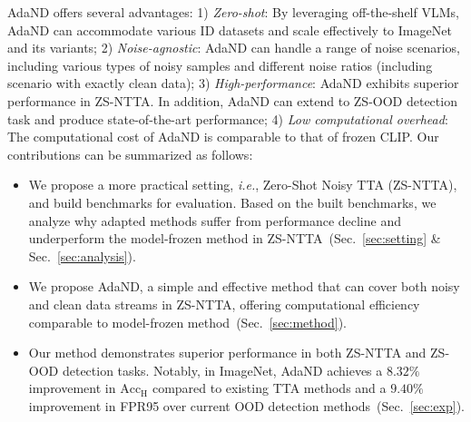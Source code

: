 AdaND offers several advantages: 1) \textit{Zero-shot}: By leveraging off-the-shelf VLMs, AdaND can accommodate various ID datasets and scale effectively to ImageNet and its variants; 2) \textit{Noise-agnostic}: AdaND can handle a range of noise scenarios, including various types of noisy samples and different noise ratios (including scenario with exactly clean data); 3) \textit{High-performance}: AdaND exhibits superior performance in ZS-NTTA. In addition, AdaND can extend to ZS-OOD detection task and produce state-of-the-art performance; 4) \textit{Low computational overhead}: The computational cost of AdaND is comparable to that of frozen CLIP. 
Our contributions can be summarized as follows:
\begin{itemize}[leftmargin=.1in]
\item We propose a more practical setting, \textit{i.e.}, Zero-Shot Noisy TTA (ZS-NTTA), and build benchmarks for evaluation. 
Based on the built benchmarks, we analyze why adapted methods suffer from performance decline and underperform the model-frozen method in ZS-NTTA~(Sec.~\ref{sec:setting} \& Sec.~\ref{sec:analysis}).


\item We propose AdaND, a simple and effective method that can cover both noisy and clean data streams in ZS-NTTA, offering computational efficiency comparable to model-frozen method~(Sec.~\ref{sec:method}).

\item Our method demonstrates superior performance in both ZS-NTTA and ZS-OOD detection tasks. Notably, in ImageNet, AdaND achieves a $8.32\%$ improvement in $\text{Acc}_\text{H}$ compared to existing TTA methods and a $9.40\%$ improvement in FPR95 over current OOD detection methods~(Sec.~\ref{sec:exp}).
\end{itemize}